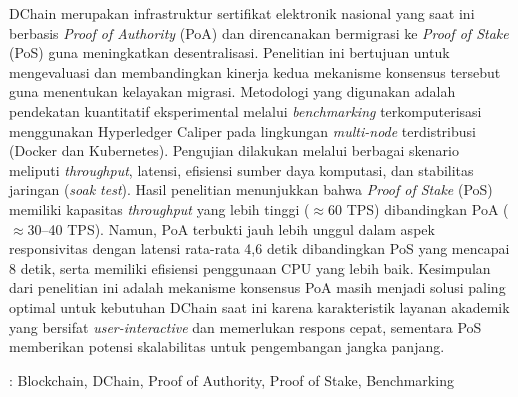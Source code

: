 DChain merupakan infrastruktur sertifikat elektronik nasional yang saat ini berbasis \textit{Proof of Authority} (PoA) dan direncanakan bermigrasi ke \textit{Proof of Stake} (PoS) guna meningkatkan desentralisasi. Penelitian ini bertujuan untuk mengevaluasi dan membandingkan kinerja kedua mekanisme konsensus tersebut guna menentukan kelayakan migrasi. Metodologi yang digunakan adalah pendekatan kuantitatif eksperimental melalui \textit{benchmarking} terkomputerisasi menggunakan Hyperledger Caliper pada lingkungan \textit{multi-node} terdistribusi (Docker dan Kubernetes). Pengujian dilakukan melalui berbagai skenario meliputi \textit{throughput}, latensi, efisiensi sumber daya komputasi, dan stabilitas jaringan (\textit{soak test}). Hasil penelitian menunjukkan bahwa \textit{Proof of Stake} (PoS) memiliki kapasitas \textit{throughput} yang lebih tinggi ($\approx$60 TPS) dibandingkan PoA ($\approx$30--40 TPS). Namun, PoA terbukti jauh lebih unggul dalam aspek responsivitas dengan latensi rata-rata 4,6 detik dibandingkan PoS yang mencapai 8 detik, serta memiliki efisiensi penggunaan CPU yang lebih baik. Kesimpulan dari penelitian ini adalah mekanisme konsensus PoA masih menjadi solusi paling optimal untuk kebutuhan DChain saat ini karena karakteristik layanan akademik yang bersifat \textit{user-interactive} dan memerlukan respons cepat, sementara PoS memberikan potensi skalabilitas untuk pengembangan jangka panjang.

\vspace{1cm}

 : Blockchain, DChain, Proof of Authority, Proof of Stake, Benchmarking